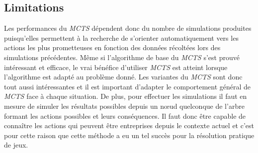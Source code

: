 \subsection*{Limitations}
Les performances du \textit{MCTS} dépendent donc du nombre de simulations produites puisqu'elles permettent à la recherche de s'orienter automatiquement vers les actions les plus prometteuses en fonction des données récoltées lors des simulations précédentes.
Même si l'algorithme de base du \textit{MCTS} s'est prouvé intéressant et efficace, le vrai bénéfice d'utiliser \textit{MCTS} est atteint lorsque l'algorithme est adapté au problème donné. Les variantes du \textit{MCTS} sont donc tout aussi intéressantes et il est important d'adapter le comportement général de \textit{MCTS} face à chaque situation.
De plus, pour effectuer les simulations il faut en mesure de simuler les résultats possibles depuis un nœud quelconque de l'arbre formant les actions possibles et leurs conséquences. Il faut donc être capable de connaître les actions qui peuvent être entreprises depuis le contexte actuel et c'est pour cette raison que cette méthode a eu un tel succès pour la résolution pratique de jeux.




%
%

